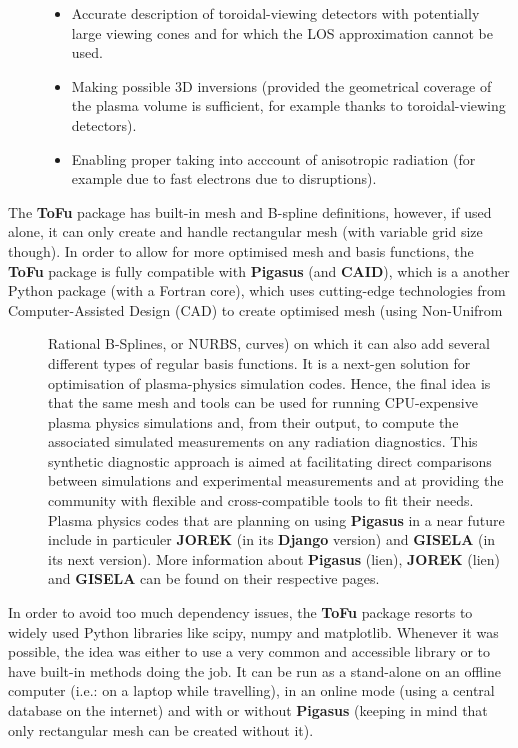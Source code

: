 \documentclass[letterpaper,10pt,english]{sphinxmanual}
\begin{document}
\begin{description}
\begin{itemize}
\item {} 
Accurate description of toroidal-viewing detectors with potentially large viewing cones and for which the LOS approximation cannot be used.

\item {} 
Making possible 3D inversions (provided the geometrical coverage of the plasma volume is sufficient, for example thanks to toroidal-viewing detectors).

\item {} 
Enabling proper taking into acccount of anisotropic radiation (for example due to fast electrons due to disruptions).

\end{itemize}

\item[{The \textbf{ToFu} package has built-in mesh and B-spline definitions, however, if used alone, it can only create and handle rectangular mesh (with variable grid size though). In order to allow for more optimised mesh and basis functions, the \textbf{ToFu} package is fully compatible with \textbf{Pigasus} (and \textbf{CAID}), which is a another Python package (with a Fortran core), which uses cutting-edge technologies from Computer-Assisted Design (CAD) to create optimised mesh (using Non-Unifrom}] \leavevmode
Rational B-Splines, or NURBS, curves) on which it can also add several different types of regular basis functions. It is a next-gen solution for optimisation of plasma-physics simulation codes. Hence, the final idea is that the same mesh and tools can be used for running CPU-expensive plasma physics simulations and, from their output, to compute the associated simulated measurements on any radiation diagnostics. This synthetic diagnostic approach is aimed at facilitating direct
comparisons between simulations and experimental measurements and at providing the community with flexible and cross-compatible tools to fit their needs. Plasma physics codes that are planning on using \textbf{Pigasus} in a near future include in particuler \textbf{JOREK} (in its \textbf{Django} version) and \textbf{GISELA} (in its next version). More information about \textbf{Pigasus} (lien), \textbf{JOREK} (lien) and \textbf{GISELA} can be found on their respective pages.

\end{description}

In order to avoid too much dependency issues, the \textbf{ToFu} package resorts to widely used Python libraries like scipy, numpy and matplotlib. Whenever it was possible, the idea was either to use a very common and accessible library or to have built-in methods doing the job. It can be run as a stand-alone on an offline computer (i.e.: on a laptop while travelling), in an online mode (using a central database on the internet) and with or without \textbf{Pigasus} (keeping in mind that only rectangular mesh can be created without it).
\end{document}
